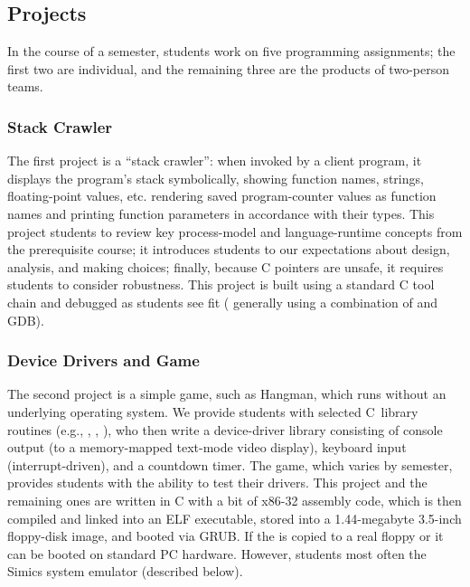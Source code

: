 \subsection{Projects}

In the course of a semester, students work on five
programming assignments; the first two are individual,
and the remaining three are the products of two-person
teams.

\subsubsection{Stack Crawler}
The first project is a ``stack crawler'':  when invoked by
a client program, it displays the program's stack
symbolically,
\shortversion
{showing function names, strings, floating-point values, etc.}
{rendering saved program-counter values
as function names and printing function parameters
in accordance with their types.}
This project
students to review key process-model and
language-runtime concepts from the
prerequisite course;
it introduces students to our expectations about
design, analysis, and making choices;
finally,
because C pointers are unsafe, it requires students
to consider robustness.
%
This project is built using a standard C tool chain
and debugged as students see fit (
{generally using a combination of}
 and GDB).

\subsubsection{Device Drivers and Game}
The second project is a simple game, such as Hangman,
which runs without an underlying
operating system.
We provide students with selected C~library routines
(e.g., , , ),
who then write a device-driver library consisting of
console output (to a memory-mapped text-mode video display),
keyboard input (interrupt-driven),
and a countdown timer.
{The game, which varies by semester, provides students
with the ability to test their drivers.}
%
%
This project and the remaining ones are written in
C with a bit of x86-32 assembly code,
which is then
compiled and linked into an ELF executable,
stored into a 1.44-megabyte 3.5-inch floppy-disk image,
and booted via GRUB.
If the  is copied to a real floppy
or 
it can be booted on standard PC hardware.
However, students most often  the Simics system emulator (described below).

